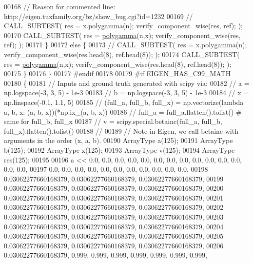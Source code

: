 \begin{DoxyCode}
00168       \textcolor{comment}{// Reason for commented line: http://eigen.tuxfamily.org/bz/show\_bug.cgi?id=1232}
00169       \textcolor{comment}{//       CALL\_SUBTEST( res = x.polygamma(n); verify\_component\_wise(res, ref); );}
00170       CALL\_SUBTEST( res = \hyperlink{namespace_eigen_ae3b47a13a0699f5dbaa0623c11333dca}{polygamma}(n,x);  verify\_component\_wise(res, ref); );
00171     \}
00172     \textcolor{keywordflow}{else} \{
00173       \textcolor{comment}{//       CALL\_SUBTEST( res = x.polygamma(n); verify\_component\_wise(res.head(8), ref.head(8)); );}
00174       CALL\_SUBTEST( res = \hyperlink{namespace_eigen_ae3b47a13a0699f5dbaa0623c11333dca}{polygamma}(n,x); verify\_component\_wise(res.head(8), ref.head(8)); );
00175     \}
00176   \}
00177 \textcolor{preprocessor}{#endif}
00178 
00179 \textcolor{preprocessor}{#if EIGEN\_HAS\_C99\_MATH}
00180   \{
00181     \textcolor{comment}{// Inputs and ground truth generated with scipy via:}
00182     \textcolor{comment}{//   a = np.logspace(-3, 3, 5) - 1e-3}
00183     \textcolor{comment}{//   b = np.logspace(-3, 3, 5) - 1e-3}
00184     \textcolor{comment}{//   x = np.linspace(-0.1, 1.1, 5)}
00185     \textcolor{comment}{//   (full\_a, full\_b, full\_x) = np.vectorize(lambda a, b, x: (a, b, x))(*np.ix\_(a, b, x))}
00186     \textcolor{comment}{//   full\_a = full\_a.flatten().tolist()  # same for full\_b, full\_x}
00187     \textcolor{comment}{//   v = scipy.special.betainc(full\_a, full\_b, full\_x).flatten().tolist()}
00188     \textcolor{comment}{//}
00189     \textcolor{comment}{// Note in Eigen, we call betainc with arguments in the order (x, a, b).}
00190     ArrayType a(125);
00191     ArrayType b(125);
00192     ArrayType x(125);
00193     ArrayType v(125);
00194     ArrayType res(125);
00195 
00196     a << 0.0, 0.0, 0.0, 0.0, 0.0, 0.0, 0.0, 0.0, 0.0, 0.0, 0.0, 0.0, 0.0, 0.0,
00197         0.0, 0.0, 0.0, 0.0, 0.0, 0.0, 0.0, 0.0, 0.0, 0.0, 0.0,
00198         0.03062277660168379, 0.03062277660168379, 0.03062277660168379,
00199         0.03062277660168379, 0.03062277660168379, 0.03062277660168379,
00200         0.03062277660168379, 0.03062277660168379, 0.03062277660168379,
00201         0.03062277660168379, 0.03062277660168379, 0.03062277660168379,
00202         0.03062277660168379, 0.03062277660168379, 0.03062277660168379,
00203         0.03062277660168379, 0.03062277660168379, 0.03062277660168379,
00204         0.03062277660168379, 0.03062277660168379, 0.03062277660168379,
00205         0.03062277660168379, 0.03062277660168379, 0.03062277660168379,
00206         0.03062277660168379, 0.999, 0.999, 0.999, 0.999, 0.999, 0.999, 0.999,

\end{DoxyCode}
